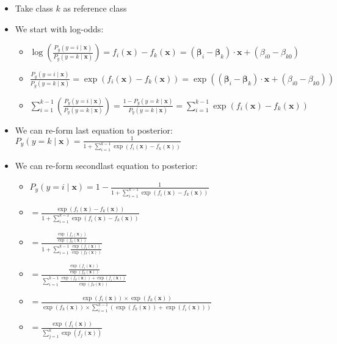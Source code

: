 \begin{itemize}
    \item Take class $k$ as reference class
    \item We start with log-odds:
    \begin{itemize}
        \item $\log\left(\frac{P_y(y = i \mid \boldsymbol{x})}{P_y(y = k \mid \boldsymbol{x})}\right) = f_i(\boldsymbol{x}) - f_k(\boldsymbol{x}) = (\boldsymbol{\beta}_i - \boldsymbol{\beta}_k) \cdot \boldsymbol{x} + (\beta_{i0} - \beta_{k0})$
        \item $\frac{P_y(y = i \mid \boldsymbol{x})}{P_y(y = k \mid \boldsymbol{x})} = \exp(f_i(\boldsymbol{x}) - f_k(\boldsymbol{x})) = \exp((\boldsymbol{\beta}_i - \boldsymbol{\beta}_k) \cdot \boldsymbol{x} + (\beta_{i0} - \beta_{k0}))$
        \item $\sum_{i=1}^{k-1} (\frac{P_y(y = i \mid \boldsymbol{x})}{P_y(y = k \mid \boldsymbol{x})}) = \frac{1 - P_y(y = k \mid \boldsymbol{x})}{P_y(y = k \mid \boldsymbol{x})} = \sum_{i=1}^{k-1} \exp(f_i(\boldsymbol{x}) - f_k(\boldsymbol{x}))$
    \end{itemize}
    \item We can re-form last equation to posterior: $P_y(y = k \mid \boldsymbol{x}) = \frac{1}{1 + \sum_{i=1}^{k-1} \exp(f_i(\boldsymbol{x}) - f_k(\boldsymbol{x}))}$
    \item We can re-form secondlast equation to posterior:
    \begin{itemize}
        \item $P_y(y = i \mid \boldsymbol{x}) = 1 - \frac{1}{1 + \sum_{i=1}^{k-1} \exp(f_i(\boldsymbol{x}) - f_k(\boldsymbol{x}))}$
        \item $= \frac{\exp(f_i(\boldsymbol{x}) - f_k(\boldsymbol{x}))}{1 + \sum_{i=1}^{k-1} \exp(f_i(\boldsymbol{x}) - f_k(\boldsymbol{x}))}$
        \item $= \frac{\frac{\exp(f_i(\boldsymbol{x}))}{\exp(f_k(\boldsymbol{x}))}}{1+ \sum_{i=1}^{k-1} \frac{\exp(f_i(\boldsymbol{x}))}{\exp(f_k(\boldsymbol{x}))}}$
        \item $= \frac{\frac{\exp(f_i(\boldsymbol{x}))}{\exp(f_k(\boldsymbol{x}))}}{ \sum_{i=1}^{k-1} \frac{\exp(f_k(\boldsymbol{x})) + \exp(f_i(\boldsymbol{x}))}{\exp(f_k(\boldsymbol{x}))}}$
        \item $= \frac{\exp(f_i(\boldsymbol{x})) \times \exp(f_k(\boldsymbol{x}))}{\exp(f_k(\boldsymbol{x})) \times \sum_{i=1}^{k-1}( \exp(f_k(\boldsymbol{x})) + \exp(f_i(\boldsymbol{x})) )}$
        \item $= \frac{\exp(f_i(\boldsymbol{x}))}{\sum_{j=1}^k \exp(f_j(\boldsymbol{x}))}$
    \end{itemize}
\end{itemize}
